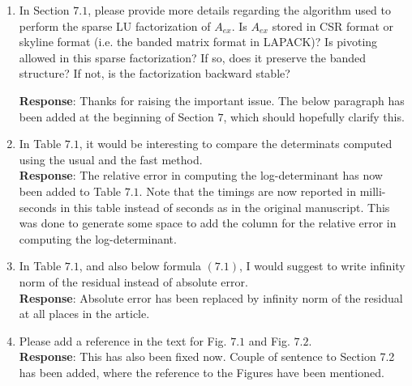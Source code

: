 \documentclass{article}
\begin{document}
\begin{enumerate}
\hrulefill

	
	\item
	In Section $7.1$, please provide more details regarding the algorithm used to perform the sparse LU factorization of $A_{ex}$. Is $A_{ex}$ stored in CSR format or skyline format (i.e. the banded matrix format in LAPACK)? Is pivoting allowed in this sparse factorization? If so, does it preserve the banded structure? If not, is the factorization backward stable?\\
	{\color{blue}\textbf{Response}: Thanks for raising the important issue. The below paragraph has been added at the beginning of Section $7$, which should hopefully clarify this.
	
}


\hrulefill

	\item
	In Table $7.1$, it would be interesting to compare the determinats computed using the usual and the fast method.\\
	{\color{blue}\textbf{Response}: The relative error in computing the log-determinant has now been added to Table $7.1$. Note that the timings are now reported in milli-seconds in this table instead of seconds as in the original manuscript. This was done to generate some space to add the column for the relative error in computing the log-determinant.}

\hrulefill

	\item
	In Table $7.1$, and also below formula $(7.1)$, I would suggest to write infinity norm of the residual instead of absolute error.\\
	{\color{blue}\textbf{Response}: Absolute error has been replaced by infinity norm of the residual at all places in the article.}

\hrulefill

	\item
	Please add a reference in the text for Fig. $7.1$ and Fig. $7.2$.\\
	{\color{blue}\textbf{Response}: This has also been fixed now. Couple of sentence to Section 7.2 has been added, where the reference to the Figures have been mentioned.}

\hrulefill
\end{enumerate}



\end{document}
